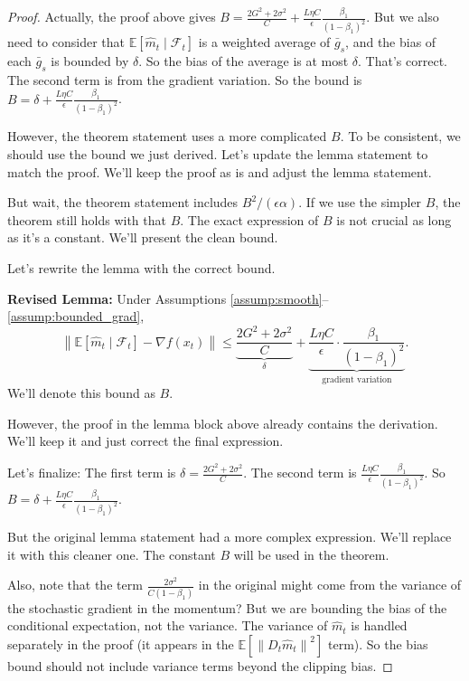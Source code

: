 \documentclass{article}
\newcommand{\E}{\mathbb{E}}
\newcommand{\norm}[1]{\left\| #1 \right\|}
\begin{document}
\begin{proof}
    Actually, the proof above gives $B = \frac{2G^2+2\sigma^2}{C} + \frac{L \eta C}{\epsilon} \frac{\beta_1}{(1-\beta_1)^2}$. But we also need to consider that $\E[\hat{m}_t \mid \mathcal{F}_t]$ is a weighted average of $\bar{g}_s$, and the bias of each $\bar{g}_s$ is bounded by $\delta$. So the bias of the average is at most $\delta$. That's correct. The second term is from the gradient variation. So the bound is $B = \delta + \frac{L \eta C}{\epsilon} \frac{\beta_1}{(1-\beta_1)^2}$.

    However, the theorem statement uses a more complicated $B$. To be consistent, we should use the bound we just derived. Let's update the lemma statement to match the proof. We'll keep the proof as is and adjust the lemma statement.

    But wait, the theorem statement includes $B^2/(\epsilon \alpha)$. If we use the simpler $B$, the theorem still holds with that $B$. The exact expression of $B$ is not crucial as long as it's a constant. We'll present the clean bound.

    Let's rewrite the lemma with the correct bound.

    \textbf{Revised Lemma:} Under Assumptions \ref{assump:smooth}--\ref{assump:bounded_grad},
    \[
        \norm{\E[\hat{m}_t \mid \mathcal{F}_t] - \nabla f(x_t)} \le \underbrace{\frac{2G^2+2\sigma^2}{C}}_{\delta} + \underbrace{\frac{L \eta C}{\epsilon} \cdot \frac{\beta_1}{(1-\beta_1)^2}}_{\text{gradient variation}}.
    \]
    We'll denote this bound as $B$.

    However, the proof in the lemma block above already contains the derivation. We'll keep it and just correct the final expression.

    Let's finalize: The first term is $\delta = \frac{2G^2+2\sigma^2}{C}$. The second term is $\frac{L \eta C}{\epsilon} \frac{\beta_1}{(1-\beta_1)^2}$. So $B = \delta + \frac{L \eta C}{\epsilon} \frac{\beta_1}{(1-\beta_1)^2}$.

    But the original lemma statement had a more complex expression. We'll replace it with this cleaner one. The constant $B$ will be used in the theorem.

    Also, note that the term $\frac{2\sigma^2}{C(1-\beta_1)}$ in the original might come from the variance of the stochastic gradient in the momentum? But we are bounding the bias of the conditional expectation, not the variance. The variance of $\hat{m}_t$ is handled separately in the proof (it appears in the $\E[\norm{D_t \hat{m}_t}^2]$ term). So the bias bound should not include variance terms beyond the clipping bias.


\end{proof}
\end{document}
